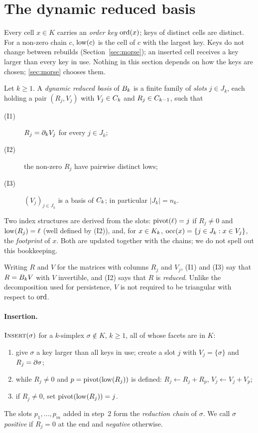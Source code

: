 \section{The dynamic reduced basis}\label{sec:drb}

Every cell $x\in K$ carries an \emph{order key} $\operatorname{ord}(x)$; keys of distinct cells
are distinct. For a non-zero chain $c$, $\operatorname{low}(c)$ is the cell of $c$ with the
largest key. Keys do not change between rebuilds (Section~\ref{sec:morse}); an
inserted cell receives a key larger than every key in use. Nothing in this
section depends on how the keys are chosen; \cref{sec:morse} chooses them.

\begin{definition}[DRB]\label{def:drb}
Let $k\ge1$. A \emph{dynamic reduced basis} of $B_{k}$ is a finite family of
\emph{slots} $j\in J_k$, each holding a pair $(R_j,V_j)$ with $V_j\in C_{k}$
and $R_j\in C_{k-1}$, such that
\begin{description}
\item[(I1)] $R_j=\partial_k V_j$ for every $j\in J_k$;
\item[(I2)] the non-zero $R_j$ have pairwise distinct lows;
\item[(I3)] $(V_j)_{j\in J_k}$ is a basis of $C_{k}$; in particular $|J_k|=n_k$.
\end{description}
Two index structures are derived from the slots: $\operatorname{pivot}(\ell)=j$ if $R_j\ne0$
and $\operatorname{low}(R_j)=\ell$ (well defined by (I2)), and, for $x\in K_{k}$,
$\operatorname{occ}(x)=\{j\in J_k : x\in V_j\}$, the \emph{footprint} of $x$. Both are updated
together with the chains; we do not spell out this bookkeeping.
\end{definition}

Writing $R$ and $V$ for the matrices with columns $R_j$ and $V_j$, (I1) and (I3)
say that $R=B_{k}V$ with $V$ invertible, and (I2) says that $R$ is
\emph{reduced}. Unlike the decomposition used for persistence, $V$ is not
required to be triangular with respect to $\operatorname{ord}$.

\paragraph{Insertion.} $\textup{\textsc{Insert}}(\sigma)$ for a $k$-simplex $\sigma\notin K$, $k\ge1$,
all of whose facets are in $K$:
\begin{enumerate}
\item give $\sigma$ a key larger than all keys in use; create a slot $j$ with
  $V_j=\{\sigma\}$ and $R_j=\partial\sigma$;
\item while $R_j\ne0$ and $p=\operatorname{pivot}(\operatorname{low}(R_j))$ is defined: $R_j\gets R_j+R_p$,
  $V_j\gets V_j+V_p$;
\item if $R_j\ne0$, set $\operatorname{pivot}(\operatorname{low}(R_j))=j$.
\end{enumerate}
The slots $p_1,\dots,p_m$ added in step~2 form the \emph{reduction chain} of
$\sigma$. We call $\sigma$ \emph{positive} if $R_j=0$ at the end and
\emph{negative} otherwise.


